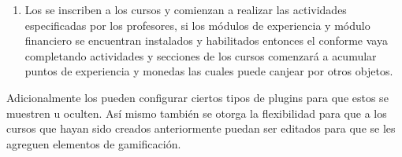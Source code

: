 \begin{enumerate}
  \item Los  se inscriben a los cursos y
        comienzan a realizar las actividades especificadas por los profesores,
        si los módulos de experiencia y módulo financiero se encuentran instalados
        y habilitados entonces el  conforme vaya
        completando actividades y secciones de los cursos comenzará a acumular puntos
        de experiencia y monedas las cuales puede canjear por otros objetos.

 \end{enumerate}

 \noindent
 Adicionalmente los  pueden configurar ciertos
 tipos de plugins para que estos se muestren u oculten. Así mismo también se otorga
 la flexibilidad para que a los cursos que hayan sido creados anteriormente puedan
 ser editados para que se les agreguen elementos de gamificación.
